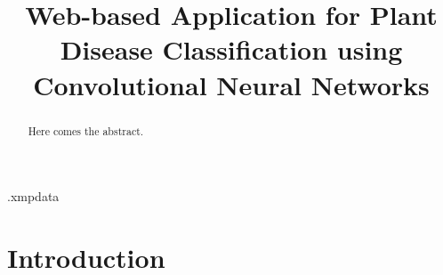 \documentclass{BachelorBUI}
\title{Web-based Application for Plant Disease Classification using Convolutional Neural Networks}
\begin{document}
\begin{filecontents}[overwrite]{\jobname.xmpdata}
\makeatletter
\Title{\@title}
\Author{\@authorname}
\Language{\@thesislanguage}
\Keywords{\@keywords}
\makeatother
\end{filecontents}
%
\maketitle

\begin{abstract}

Here comes the abstract.

\end{abstract}
\tableofcontents
\section{Introduction}
\end{document}
